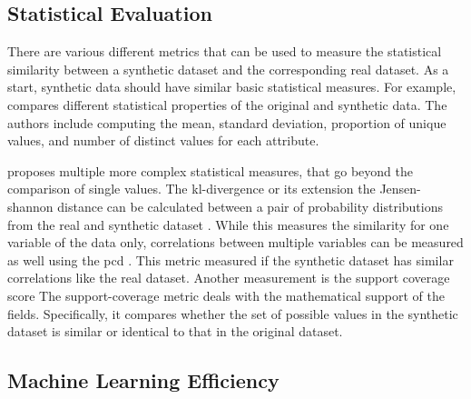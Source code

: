 \subsection{Statistical Evaluation}
\label{ch:preliminaries-statisticalEvaluation}

There are various different metrics that can be used to measure the statistical similarity between a synthetic dataset and the corresponding real dataset.
As a start, synthetic data should have similar basic statistical measures.
For example, \cite{delcarmenrodriguez-hernandez2017DataGenCARSGeneratorSynthetic} compares different statistical properties of the original and synthetic data. 
The authors include computing the mean, standard deviation, proportion of unique values, and number of distinct values for each attribute.

\cite{goncalves2020GenerationEvaluationSynthetic} proposes multiple more complex statistical measures, that go beyond the comparison of single values.
The \gls{kl}-divergence or its extension the Jensen-shannon distance \cite{zhao2022CTABGANEnhancingTabular} can be calculated between a pair of probability distributions from the real and synthetic dataset \cite{goncalves2020GenerationEvaluationSynthetic, li2022TTSGANTransformerbasedTimeSeries}.
While this measures the similarity for one variable of the data only, correlations between multiple variables can be measured as well using the \gls{pcd} \cite{goncalves2020GenerationEvaluationSynthetic}.
This metric measured if the synthetic dataset has similar correlations like the real dataset.
Another measurement is the support coverage score \cite{goncalves2020GenerationEvaluationSynthetic}
The support-coverage metric deals with the mathematical support of the fields. 
Specifically, it compares whether the set of possible values in the synthetic dataset is similar or identical to that in the original dataset.

\subsection{Machine Learning Efficiency}
\label{ch:preliminaries-machineLearningEfficiency}

